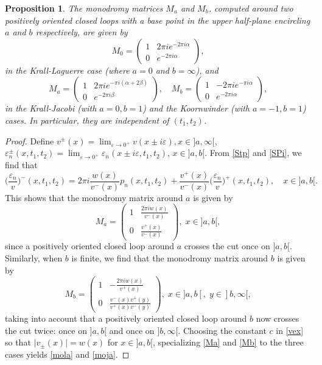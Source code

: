 \documentclass[10pt, reqno]{amsart}
\numberwithin{equation}{section}
\newtheorem{proposition}{Proposition}[section]
\numberwithin{equation}{section}
\begin{document}
\begin{proposition} \label{proposition 2.1} 
The monodromy matrices $M_a$ and $M_b$, computed around two positively oriented closed loops with a base point in the upper half-plane encircling $a$ and $b$ respectively, are given by 
\begin{equation}\label{mola}
M_0=\begin{pmatrix} 1& 2\pi i e^{-2\pi i \alpha}\\ 0& e^{-2\pi i \alpha}\end{pmatrix},
\end{equation}
in the Krall-Laguerre case (where $a=0$ and $b=\infty$), and 
\begin{equation}\label{moja}
M_a=\begin{pmatrix} 1& 2\pi i e^{-\pi i (\alpha+2\beta)}\\ 0&e^{-2\pi i \beta}\end{pmatrix},\quad M_b=\begin{pmatrix} 1&-2\pi i e^{-\pi i \alpha}\\ 0& e^{-2\pi i \alpha}\end{pmatrix},
\end{equation}
in the Krall-Jacobi (with $a=0, b=1$) and the Koornwinder (with $a=-1,b=1$) cases. In particular, they are independent of $(t_1,t_2)$.
\end{proposition}
\begin{proof}
Define $v^{\pm}(x)=\lim_{\varepsilon \to 0^+} v(x\pm i\varepsilon), x\in]a,\infty[$, $\varepsilon^{\pm}_n(x,t_1,t_2)=\lim_{\varepsilon \to 0^+} \varepsilon_n (x\pm i\varepsilon,t_1,t_2)$, $x\in]a,b[$. From \eqref{Stp} and \eqref{SPi}, we find that
\begin{equation*}
\Big(\frac{\varepsilon_n}{v}\Big)^{-}(x,t_1,t_2)=2\pi i\frac{w(x)}{v^{-}(x)}p_n(x,t_1,t_2)+\frac{v^{+}(x)}{v^{-}(x)}\Big(\frac{\varepsilon_n}{v}\Big)^{+}(x,t_1,t_2),\quad x\in]a,b[.
\end{equation*}
This shows that the monodromy matrix around $a$ is given by 
\begin{equation} \label{Ma}
M_a=\begin{pmatrix} 1&\frac{2\pi i w(x)}{v^{-}(x)}\\0&\frac{v^{+}(x)}{v^{-}(x)}\end{pmatrix},\;x\in]a,b[,
\end{equation}
since a positively oriented closed loop around $a$ crosses the cut once on $]a,b[$. Similarly, when $b$ is finite, we find that the monodromy matrix around $b$ is given by
\begin{equation} \label{Mb} 
M_b=\begin{pmatrix} 1&-\frac{2\pi i w(x)}{v^+(x)}\\0&\frac{v^{-}(x)v^+(y)}{v^+(x)v^{-}(y)}\end{pmatrix},\; x\in]a,b[, \; y\in]b,\infty[,
\end{equation}
taking into account that a positively oriented closed loop around $b$ now crosses the cut twice: once on  $]a,b[$ and once on $]b,\infty[$. Choosing the constant $c$ in \eqref{vex} so that $\vert v_{\pm}(x)\vert=w(x)$ for $x\in ]a,b[$, specializing \eqref{Ma} and \eqref{Mb} to the three cases yields \eqref{mola} and \eqref{moja}. 
\end{proof}
\end{document}
